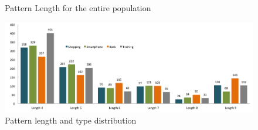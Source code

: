 		\begin{figure}[H]
      \centering
      \caption{Pattern Length for the entire population}
    \end{figure}

    \begin{figure}[H]
      \centering
      \includegraphics[width=\textwidth]{pics/analysis/patterntypePatternLength.png}
      \caption{Pattern length and type distribution}
      \label{fig:patternTypePatternLength}
    \end{figure}


